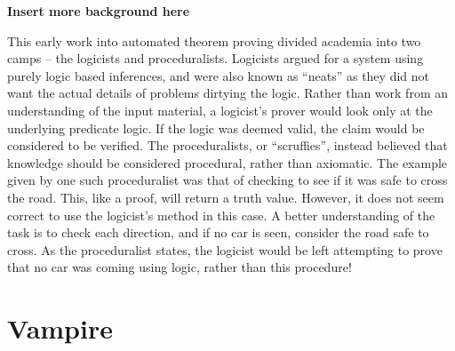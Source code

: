\textbf{Insert more background here}

This early work into automated theorem proving divided academia into two camps -- the logicists and proceduralists. Logicists argued for a system using purely logic based inferences, and were also known as ``neats'' as they did not want the actual details of problems dirtying the logic. Rather than work from an understanding of the input material, a logicist's prover would look only at the underlying predicate logic. If the logic was deemed valid, the claim would be considered to be verified. The proceduralists, or ``scruffies'', instead believed that knowledge should be considered procedural, rather than axiomatic. The example given by one such proceduralist was that of checking to see if it was safe to cross the road. This, like a proof, will return a truth value. However, it does not seem correct to use the logicist's method in this case. A better understanding of the task is to check each direction, and if no car is seen, consider the road safe to cross. As the proceduralist states, the logicist would be left attempting to prove that no car was coming using logic, rather than this procedure!



\section{Vampire}

